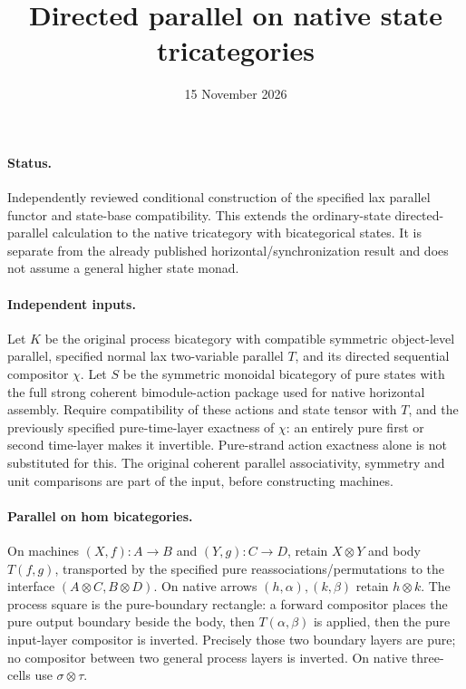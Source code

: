 \documentclass{article}
\title{Directed parallel on native state tricategories}
\date{15 November 2026}
\begin{document}
\maketitle
\paragraph{Status.} Independently reviewed conditional construction of the specified lax parallel functor and state-base compatibility. This extends the ordinary-state directed-parallel calculation to the native tricategory with bicategorical states. It is separate from the already published horizontal/synchronization result and does not assume a general higher state monad.

\paragraph{Independent inputs.} Let $K$ be the original process bicategory with compatible symmetric object-level parallel, specified normal lax two-variable parallel $T$, and its directed sequential compositor $\chi$. Let $S$ be the symmetric monoidal bicategory of pure states with the full strong coherent bimodule-action package used for native horizontal assembly. Require compatibility of these actions and state tensor with $T$, and the previously specified pure-time-layer exactness of $\chi$: an entirely pure first or second time-layer makes it invertible. Pure-strand action exactness alone is not substituted for this. The original coherent parallel associativity, symmetry and unit comparisons are part of the input, before constructing machines.

\paragraph{Parallel on hom bicategories.} On machines $(X,f):A\to B$ and $(Y,g):C\to D$, retain $X\otimes Y$ and body $T(f,g)$, transported by the specified pure reassociations/permutations to the interface $(A\otimes C,B\otimes D)$. On native arrows $(h,\alpha),(k,\beta)$ retain $h\otimes k$. The process square is the pure-boundary rectangle: a forward compositor places the pure output boundary beside the body, then $T(\alpha,\beta)$ is applied, then the pure input-layer compositor is inverted. Precisely those two boundary layers are pure; no compositor between two general process layers is inverted. On native three-cells use $\sigma\otimes\tau$.
\end{document}
